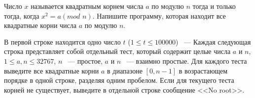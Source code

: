 Число $x$ называется квадратным корнем числа $a$ по модулю $n$
тогда и только тогда, когда $x^2 = a (mod \,\,n)$.
Напишите программу, которая находит все квадратные корни числа $a$
по модулю $n$.

\InputFile
В первой строке находится одно число $t$ ($1 \le t \le 100000$) ~---
Каждая следующая строка представляет собой отдельный тест,
который содержит целые числа $a$ и $n$, $1 \le a, n \le 32767$,
$n$ ~--- простое, $a$ и $n$ ~--- взаимно простые.
\OutputFile
Для каждого теста выведите все квадратные корни $a$ в диапазоне $[0, n-1]$
в возрастающем порядке в одной строке, разделяя одним пробелом.
Если для текущего теста корней не существует,
выведите в отдельной строке сообщение <<No root>>.
